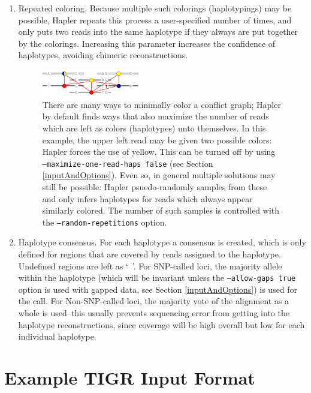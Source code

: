 \documentclass[11pt]{llncs}
\begin{document}
\begin{enumerate}
	\item Repeated coloring. Because multiple such colorings (haplotypings) may be possible, Hapler repeats this process a user-specified number of 
	times, and only puts two reads into the same haplotype if they always are put together by the colorings. Increasing this parameter increases the
	confidence of haplotypes, avoiding chimeric reconstructions.
	
\begin{figure}[!h]
\centering
   \includegraphics[width=0.4\textwidth]{graphics/two_haps_bicolor}
   \caption{There are many ways to minimally color a conflict graph; Hapler by default finds ways that also maximize the number of reads which 
   are left as colors (haplotypes) unto themselves. In this example, the upper left read may be given two possible colors: Hapler forces the use of
   yellow. This can be turned off by using \texttt{--maximize-one-read-haps false} (see Section \ref{inputAndOptions}). 
   Even so, in general multiple solutions may still be possible: Hapler psuedo-randomly samples from these and only infers haplotypes
   for reads which always appear similarly colored. The number of such samples is controlled with the \texttt{--random-repetitions} option.}
   \label{alternatecoloring}
\end{figure}

	
	\item Haplotype consensus. For each haplotype a consensus is created, which is only defined for regions that are covered by reads assigned to the 
	haplotype. Undefined regions are left as `~'. For SNP-called loci, the majority allele within the haplotype (which will be invariant unless the
	\texttt{--allow-gaps true} option is used with gapped data, see Section \ref{inputAndOptions}) is used for the call. For Non-SNP-called loci, the majority
	vote of the alignment as a whole is used--this usually prevents sequencing error from getting into the haplotype reconstructions, since coverage 
	will be high overall but low for each individual haplotype.

\end{enumerate}



\appendix

\newpage
\section{Example TIGR Input Format}
\label{exampleTigrInputFormat}
\end{document}
